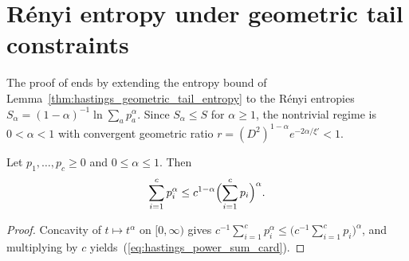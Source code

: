 \section{Rényi entropy under geometric tail constraints}
\label{sec:hastings_renyi_tail_entropy}


The proof of \cite[Lemma~2]{Hastings2007AreaLaw} ends by extending the entropy
bound of Lemma~\ref{thm:hastings_geometric_tail_entropy} to the Rényi
entropies $S_\alpha=(1-\alpha)^{-1}\ln\sum_ap_a^\alpha$. Since
$S_\alpha\le S$ for $\alpha\ge1$, the nontrivial regime is $0<\alpha<1$ with
convergent geometric ratio $r=(D^2)^{1-\alpha}e^{-2\alpha/\xi'}<1$.

\begin{lemma}
    \label{thm:hastings_power_sum_card}
    \leanok
    Let $p_1,\dots,p_c\ge0$ and $0\le\alpha\le1$. Then
    \begin{align}
        \sum_{i=1}^cp_i^\alpha\le c^{1-\alpha}\Bigl(\sum_{i=1}^cp_i\Bigr)^\alpha.
        \label{eq:hastings_power_sum_card}
    \end{align}
\end{lemma}
\begin{proof}\leanok
    Concavity of $t\mapsto t^\alpha$ on $[0,\infty)$ gives
    $c^{-1}\sum_{i=1}^cp_i^\alpha\le\bigl(c^{-1}\sum_{i=1}^cp_i\bigr)^\alpha$,
    and multiplying by $c$ yields~(\ref{eq:hastings_power_sum_card}).
\end{proof}

